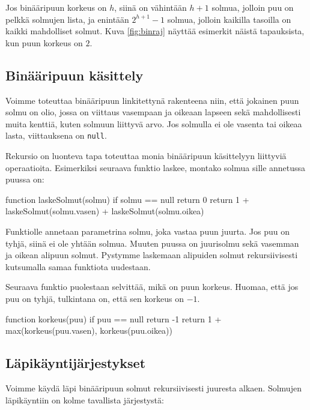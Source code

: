 Jos binääripuun korkeus on $h$, siinä on vähintään $h+1$ solmua,
jolloin puu on pelkkä solmujen lista,
ja enintään $2^{h+1}-1$ solmua,
jolloin kaikilla tasoilla on kaikki mahdolliset solmut.
Kuva \ref{fig:binraj} näyttää esimerkit näistä tapauksista,
kun puun korkeus on $2$.

\subsection{Binääripuun käsittely}

Voimme toteuttaa binääripuun linkitettynä rakenteena niin,
että jokainen puun solmu on olio, jossa on viittaus
vasempaan ja oikeaan lapseen sekä mahdollisesti
muita kenttiä, kuten solmuun liittyvä arvo.
Jos solmulla ei ole vasenta tai oikeaa lasta,
viittauksena on \texttt{null}.

Rekursio on luonteva tapa toteuttaa monia
binääripuun käsittelyyn liittyviä operaatioita.
Esimerkiksi seuraava funktio laskee, montako solmua
sille annetussa puussa on:

\begin{code}
function laskeSolmut(solmu)
    if solmu == null
        return 0
    return 1 + laskeSolmut(solmu.vasen) +
                laskeSolmut(solmu.oikea)
\end{code}

Funktiolle annetaan parametrina solmu,
joka vastaa puun juurta.
Jos puu on tyhjä, siinä ei ole yhtään solmua.
Muuten puussa on juurisolmu sekä vasemman
ja oikean alipuun solmut.
Pystymme laskemaan alipuiden solmut rekursiivisesti
kutsumalla samaa funktiota uudestaan.

Seuraava funktio puolestaan selvittää, mikä on puun korkeus.
Huomaa, että jos puu on tyhjä, tulkintana on,
että sen korkeus on $-1$.

\begin{code}
function korkeus(puu)
    if puu == null
        return -1
    return 1 + max(korkeus(puu.vasen), korkeus(puu.oikea))
\end{code}

\subsection{Läpikäyntijärjestykset}

Voimme käydä läpi binääripuun solmut rekursiivisesti
juuresta alkaen.
Solmujen läpikäyntiin on kolme tavallista järjestystä:



